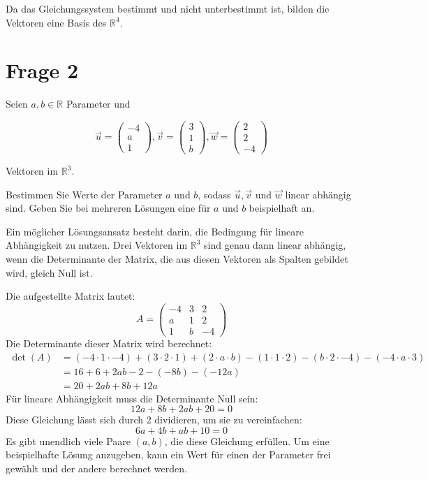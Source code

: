 Da das Gleichungssystem bestimmt und nicht unterbestimmt ist, bilden die Vektoren eine Basis des $\mathbb{R}^4$.

\section{Frage 2}

Seien $a, b \in \mathbb{R}$ Parameter und 

\[
    \vec{u}= \begin{pmatrix}
        -4 \\ a \\1
    \end{pmatrix}, \vec{v} = \begin{pmatrix}
        3 \\ 1 \\ b
    \end{pmatrix}, \vec{w} = \begin{pmatrix}
        2 \\ 2 \\ -4
    \end{pmatrix}
\]

Vektoren im $\mathbb{R}^3$.

Bestimmen Sie Werte der Parameter $a$ und $b$, sodass $\vec{u}, \vec{v}$ und $\vec{w}$ linear abhängig sind. Geben Sie bei mehreren Lösungen eine für $a$ und $b$ beispielhaft an.

Ein möglicher Lösungsansatz besteht darin, die Bedingung für lineare Abhängigkeit zu nutzen. Drei Vektoren im $\mathbb{R}^3$ sind genau dann linear abhängig, wenn die Determinante der Matrix, die aus diesen Vektoren als Spalten gebildet wird, gleich Null ist.

Die aufgestellte Matrix lautet:
\[
A = \begin{pmatrix}
    -4 & 3 & 2 \\
    a & 1 & 2 \\
    1 & b & -4
\end{pmatrix}
\]
Die Determinante dieser Matrix wird berechnet:
\begin{align*}
    \det(A) &= (-4 \cdot 1 \cdot -4) + (3 \cdot 2 \cdot 1) + (2 \cdot a \cdot b) - (1 \cdot 1 \cdot 2) - (b \cdot 2 \cdot -4) - (-4 \cdot a \cdot 3) \\
    &= 16 + 6 + 2ab - 2 - (-8b) - (-12a) \\
    &= 20 + 2ab + 8b + 12a
\end{align*}
Für lineare Abhängigkeit muss die Determinante Null sein:
\[
    12a + 8b + 2ab + 20 = 0
\]
Diese Gleichung lässt sich durch 2 dividieren, um sie zu vereinfachen:
\[
    6a + 4b + ab + 10 = 0
\]
Es gibt unendlich viele Paare $(a, b)$, die diese Gleichung erfüllen. Um eine beispielhafte Lösung anzugeben, kann ein Wert für einen der Parameter frei gewählt und der andere berechnet werden.

